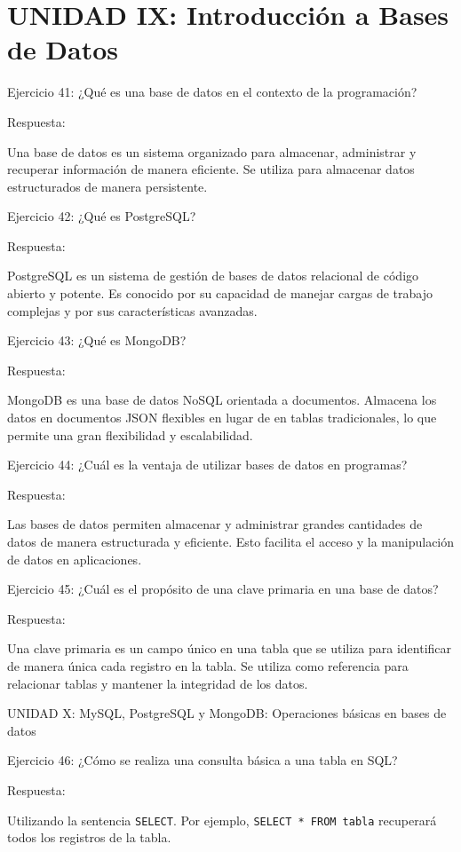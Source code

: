 \documentclass[
  a4paper,
  DIV=11,
  numbers=noendperiod,
  onepage,
  openany]{scrreprt}
\begin{document}
\section{UNIDAD IX: Introducción a Bases de
Datos}\label{unidad-ix-introducciuxf3n-a-bases-de-datos}

Ejercicio 41: ¿Qué es una base de datos en el contexto de la
programación?

Respuesta:

Una base de datos es un sistema organizado para almacenar, administrar y
recuperar información de manera eficiente. Se utiliza para almacenar
datos estructurados de manera persistente.

Ejercicio 42: ¿Qué es PostgreSQL?

Respuesta:

PostgreSQL es un sistema de gestión de bases de datos relacional de
código abierto y potente. Es conocido por su capacidad de manejar cargas
de trabajo complejas y por sus características avanzadas.

Ejercicio 43: ¿Qué es MongoDB?

Respuesta:

MongoDB es una base de datos NoSQL orientada a documentos. Almacena los
datos en documentos JSON flexibles en lugar de en tablas tradicionales,
lo que permite una gran flexibilidad y escalabilidad.

Ejercicio 44: ¿Cuál es la ventaja de utilizar bases de datos en
programas?

Respuesta:

Las bases de datos permiten almacenar y administrar grandes cantidades
de datos de manera estructurada y eficiente. Esto facilita el acceso y
la manipulación de datos en aplicaciones.

Ejercicio 45: ¿Cuál es el propósito de una clave primaria en una base de
datos?

Respuesta:

Una clave primaria es un campo único en una tabla que se utiliza para
identificar de manera única cada registro en la tabla. Se utiliza como
referencia para relacionar tablas y mantener la integridad de los datos.

UNIDAD X: MySQL, PostgreSQL y MongoDB: Operaciones básicas en bases de
datos

Ejercicio 46: ¿Cómo se realiza una consulta básica a una tabla en SQL?

Respuesta:

Utilizando la sentencia \texttt{SELECT}. Por ejemplo,
\texttt{SELECT\ *\ FROM\ tabla} recuperará todos los registros de la
tabla.
\end{document}
